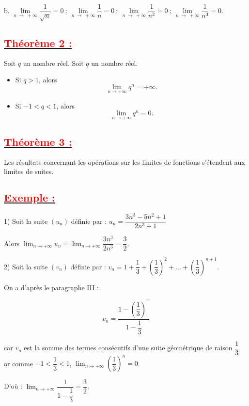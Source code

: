\documentclass[12pt]{article}
\begin{document}
b. $\lim\limits_{n\;\longrightarrow\;+\infty}\dfrac{1}{\sqrt{n}}=0\ ;\ \lim\limits_{n\;\longrightarrow\;+\infty}\dfrac{1}{n}=0\ ;\ \lim\limits_{n\;\longrightarrow\;+\infty}\dfrac{1}{n^{2}}=0\ ;\ \lim\limits_{n\;\longrightarrow\;+\infty}\dfrac{1}{n^{3}}=0.$
\subsection*{\underline{\textbf{\textcolor{red}{Théorème 2 :}}}}
Soit $q$ un nombre réel.
Soit \( q \) un nombre réel.

\begin{itemize}
    \item Si \( q > 1 \), alors
    \[
    \lim_{n \rightarrow +\infty} q^n = +\infty.
    \]
    
    \item Si \( -1 < q < 1 \), alors
    \[
    \lim_{n \rightarrow +\infty} q^n = 0.
    \]
\end{itemize}
\subsection*{\underline{\textbf{\textcolor{red}{Théorème 3 :}}}}
Les résultats concernant les opérations sur les limites de fonctions s'étendent aux limites de suites.
\subsection*{\underline{\textbf{\textcolor{red}{Exemple :}}}}

1) Soit la suite \( (u_{n}) \) définie par : \( u_{n} = \dfrac{3n^{3} - 5n^{2} + 1}{2n^{3} + 1} \)

Alors \( \lim_{n \rightarrow +\infty} u_{n} = \lim_{n \rightarrow +\infty} \dfrac{3n^{3}}{2n^{3}} = \dfrac{3}{2} \).

2) Soit la suite \( (v_{n}) \) définie par : \( v_{n} = 1 + \dfrac{1}{3} + \left(\dfrac{1}{3}\right)^{2} + \ldots + \left(\dfrac{1}{3}\right)^{n+1} \).

On a d'après le paragraphe III :

\[
v_{n} = \dfrac{1 - \left(\dfrac{1}{3}\right)^{''}}{1 - \dfrac{1}{3}}
\]

car \( v_{n} \) est la somme des termes consécutifs d'une suite géométrique de raison \( \dfrac{1}{3} \), or comme \( -1 < \dfrac{1}{3} < 1 \), \( \lim_{n \rightarrow +\infty} \left(\dfrac{1}{3}\right)^{n} = 0 \).

D'où : \( \lim_{n \rightarrow +\infty} \dfrac{1}{1 - \dfrac{1}{3}} = \dfrac{3}{2} \).
\end{document}
